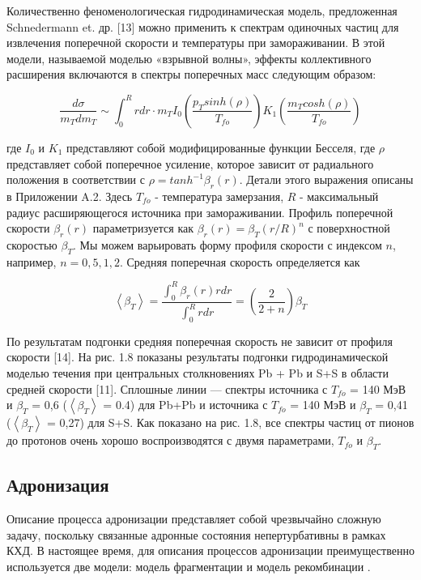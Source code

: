 Количественно феноменологическая гидродинамическая модель, предложенная Schnedermann et. др. [13] можно применить к спектрам одиночных частиц для извлечения поперечной скорости и температуры при замораживании. В этой модели, называемой моделью «взрывной волны», эффекты коллективного расширения включаются в спектры поперечных масс следующим образом:

\begin{linenomath}
	\begin{equation}
		\frac{d \sigma}{m_T dm_T} \sim \int_0^R r dr \cdot m_T 
		I_0 \left(\frac{p_T sinh(\rho)}{T_{fo}}\right) K_1 \left(\frac{m_T cosh(\rho)}{T_{fo}} \right)
	\end{equation}
\end{linenomath}
где $I_0$ и $K_1$ представляют собой модифицированные функции Бесселя, где $\rho$ представляет собой поперечное усиление, которое зависит от радиального положения в соответствии с $\rho = tanh^{-1} \beta_r(r)$. Детали этого выражения описаны в Приложении A.2. Здесь $T_{fo}$ - температура замерзания, $R$ - максимальный радиус расширяющегося источника при замораживании. Профиль поперечной скорости $\beta_r(r)$ параметризуется как $\beta_r(r) = \beta_T(r/R)^n$ с поверхностной скоростью $\beta_T$. Мы можем варьировать форму профиля скорости с индексом $n$, например, $n = 0,5,1,2$. Средняя поперечная скорость определяется как
\begin{linenomath}
	\begin{equation}
		\left< \beta_T \right> = \frac{\int_0^R \beta_r(r)r dr}{\int_0^R r dr} = \left(\frac{2}{2+n} \right)\beta_T
	\end{equation}
\end{linenomath}
По результатам подгонки средняя поперечная скорость не зависит от профиля скорости [14]. На рис. 1.8 показаны результаты подгонки гидродинамической моделью течения при центральных столкновениях Pb + Pb и S+S в области средней скорости [11]. Сплошные линии — спектры источника с $T_{fo}$ = 140 МэВ и $\beta_T$ = 0,6 ($\left< \beta_T \right>$ = 0.4) для Pb+Pb и источника с $T_{fo}$ = 140 МэВ и $\beta_T$ = 0,41 ($\left< \beta_T \right>$ = 0,27) для S+S. Как показано на рис. 1.8, все спектры частиц от пионов до протонов очень хорошо воспроизводятся с двумя параметрами, $T_{fo}$ и $\beta_T$.

\subsection{Адронизация} \label{subsec:ch1/sec1_1}
Описание процесса адронизации представляет собой чрезвычайно сложную задачу, поскольку связанные адронные состояния непертурбативны в рамках КХД.
В настоящее время, для описания процессов адронизации преимущественно используется две модели: модель фрагментации \cite{FragmentationLund} и модель рекомбинации \cite{Coalescence_models}. 

